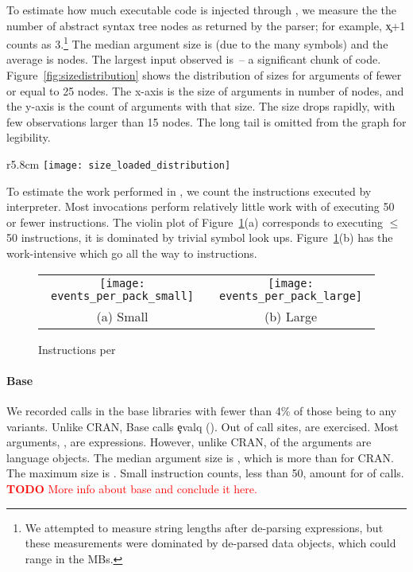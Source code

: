 \documentclass[screen,acmsmall]{acmart}
\newcommand{\authorcomment}[3]{\xspace\textcolor{#1}{{\bf #2} #3}\xspace}
\newcommand{\todo}[1]{\authorcomment{red}{TODO}{#1}}
\begin{document}
To estimate how much executable code is injected through \eval, we measure the
the number of abstract syntax tree nodes as returned by the parser; for example,
\c{x+1} counts as 3.\footnote{We attempted to measure string lengths after
de-parsing expressions, but these measurements were dominated by de-parsed data
objects, which could range in the MBs.} The median argument size is
\Medianszeval (due to the many symbols) and the average is \Avgszeval nodes. The
largest \eval input observed is \Maxszeval\,-- a significant chunk of code.
Figure~\ref{fig:sizedistribution} shows the distribution of sizes for arguments
of fewer or equal to 25 nodes.
The x-axis is the size of arguments in number of
nodes, and the y-axis is the count of arguments with that size. The size drops
rapidly, with few observations larger than 15 nodes. The long tail is omitted
from the graph for legibility.
%
\begin{wrapfigure}{r}{5.8cm}
 \hspace*{-10mm}
 \texttt{[image: size\_loaded\_distribution]}
 \caption{Loaded code} \label{fig:sizedistribution}
\end{wrapfigure}
%

To estimate the work performed in \evals, we count the instructions executed by
interpreter. Most invocations perform relatively little work with
\Smalleventspct of \evals executing 50 or fewer instructions. The violin plot of
Figure~\ref{ev}(a) corresponds to \evals executing $\leq$ 50 instructions, it is
dominated by trivial symbol look ups. Figure~\ref{ev}(b) has the work-intensive
\evals which go all the way to \MaxeventsRnd instructions.

\begin{figure}[tb!]
\begin{tabular}{@{}c@{}c@{}}
\begin{minipage}{7.5cm}
 \texttt{[image: events\_per\_pack\_small]}
\end{minipage}&\begin{minipage}{7.5cm}
  \texttt{[image: events\_per\_pack\_large]}
\end{minipage}\\[-3mm]
\small (a) Small & \small (b) Large
\end{tabular}
 \caption{Instructions per \eval} \label{ev}
\end{figure}

\paragraph{Base}
We recorded \baseAllcalls \eval calls in the base libraries with fewer than 4\%
of those being to any variants. Unlike CRAN, Base calls \c{evalq} (\baseEvalqs).
Out of \baseStaticeval call sites, \baseTriggeredevalpct are exercised. Most
arguments, \baseCodepercent, are expressions. However, unlike CRAN,
\baseLanguagepercent of the arguments are language objects. The median argument
size is \baseMedianszeval, which is more than for CRAN. The maximum size is
\baseMaxszeval. Small instruction counts, less than 50, amount for
\baseSmalleventspct of calls.
\todo{More info about base and conclude it here.}
\end{document}
